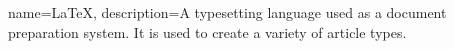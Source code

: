 \makeglossaries


{
    name=\LaTeX,
    description={A typesetting language used as a document preparation system. It is used to create a variety of article types.}
}
